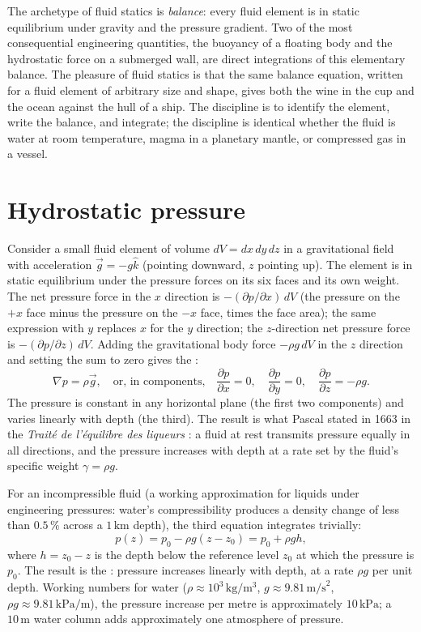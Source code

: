 \begin{archetype}[Balance]
The archetype of fluid statics is \emph{balance}: every fluid
element is in static equilibrium under gravity and the pressure
gradient. Two of the most consequential engineering quantities,
the buoyancy of a floating body and the hydrostatic force on a
submerged wall, are direct integrations of this elementary
balance. The pleasure of fluid statics is that the same balance
equation, written for a fluid element of arbitrary size and
shape, gives both the wine in the cup and the ocean against the
hull of a ship. The discipline is to identify the element, write
the balance, and integrate; the discipline is identical whether
the fluid is water at room temperature, magma in a planetary
mantle, or compressed gas in a vessel.
\end{archetype}

\section{Hydrostatic pressure}

Consider a small fluid element of volume $dV = dx\,dy\,dz$ in a
gravitational field with acceleration $\vec{g} = -g\hat{k}$
(pointing downward, $z$ pointing up). The element is in static
equilibrium under the pressure forces on its six faces and its
own weight. The net pressure force in the $x$ direction is
$-(\partial p/\partial x)\,dV$ (the pressure on the $+x$ face
minus the pressure on the $-x$ face, times the face area); the
same expression with $y$ replaces $x$ for the $y$ direction; the
$z$-direction net pressure force is $-(\partial p/\partial z)\,
dV$. Adding the gravitational body force $-\rho g \,dV$ in the
$z$ direction and setting the sum to zero gives the
:
\[
\nabla p = \rho \vec{g}, \quad \text{or, in components,} \quad
\frac{\partial p}{\partial x} = 0, \quad \frac{\partial p}{
\partial y} = 0, \quad \frac{\partial p}{\partial z} = -\rho g.
\]
The pressure is constant in any horizontal plane (the first two
components) and varies linearly with depth (the third). The
result is what Pascal stated in 1663 in the \emph{Trait{\'e} de
l'{\'e}quilibre des liqueurs} \cite[Treatise I, ch.~1]{
hist:pascal1663}: a fluid at rest transmits pressure equally in
all directions, and the pressure increases with depth at a rate
set by the fluid's specific weight $\gamma = \rho g$.

For an incompressible fluid (a working approximation for liquids
under engineering pressures: water's compressibility produces a
density change of less than $0.5\,\%$ across a $1\,\text{km}$
depth), the third equation integrates trivially:
\[
p(z) = p_0 - \rho g (z - z_0) = p_0 + \rho g h,
\]
where $h = z_0 - z$ is the depth below the reference level $z_0$
at which the pressure is $p_0$. The result is the
: pressure increases linearly
with depth, at a rate $\rho g$ per unit depth. Working numbers
for water ($\rho \approx 10^3\,\si{\kilogram\per\meter\cubed}$,
$g \approx 9.81\,\text{m/s}^2$, $\rho g \approx 9.81\,\text{kPa/m}$),
the pressure increase per metre is approximately $10\,\text{kPa}$;
a $10\,\si{\meter}$ water column adds approximately one
atmosphere of pressure.

